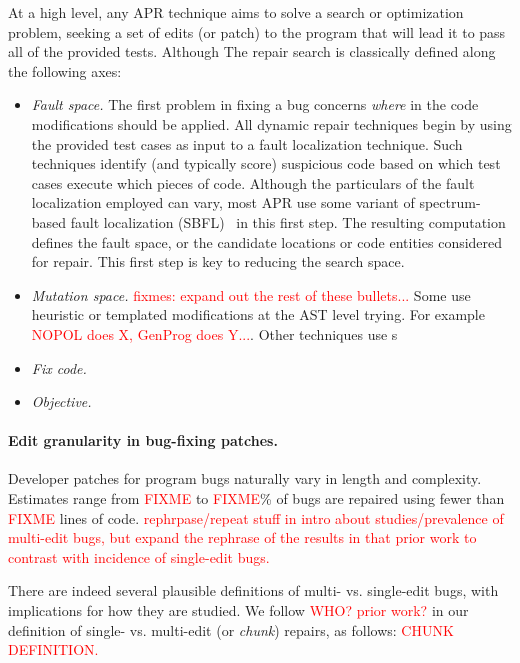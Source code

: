 \documentclass[sigconf, timestamp-false, anonymous=true]{acmart}
\newcommand\todo[1]{\textcolor{red}{#1}}
\begin{document}
At a high level, any APR technique aims to solve a search or optimization
problem, seeking a set of edits (or patch) to the program that will lead it to
pass all of the provided tests.  Although The repair search is classically defined along
the following axes:
\begin{itemize}
\item \emph{Fault space.} The first problem in fixing a bug concerns
  \emph{where} in the code modifications should be applied. All dynamic repair
  techniques begin by using the provided test cases as input to a fault
  localization technique. Such techniques identify (and typically score)
  suspicious code based on which test cases execute which pieces of code.
  Although the particulars of the fault localization employed can vary, most APR
  use some variant of spectrum-based fault localization (SBFL)~\cite{refs} in
  this first step. The resulting computation defines the fault space, or the
  candidate locations or code entities considered for repair. This first step is
  key to reducing the search space.
\item \emph{Mutation space.} \todo{fixmes: expand out the rest of these bullets...}
Some use heuristic or templated modifications at the AST level trying. For
example \todo{NOPOL does X, GenProg does Y...}. Other techniques use s

\item \emph{Fix code.}

\item \emph{Objective.} 

\end{itemize}



\paragraph{Edit granularity in bug-fixing patches.}  Developer patches for
program bugs naturally vary in length and complexity.  Estimates range from
\todo{FIXME} to \todo{FIXME}\% of bugs are repaired using fewer than
\todo{FIXME} lines of code.  \todo{rephrpase/repeat stuff in intro about
  studies/prevalence of multi-edit bugs, but expand the rephrase of the results
  in that prior work to contrast with incidence of single-edit bugs.}  

There are indeed several plausible definitions of multi- vs. single-edit bugs,
with implications for how they are studied.  We follow \todo{WHO? prior work?}
in our definition of single- vs. multi-edit (or \emph{chunk}) repairs, as
follows: 
\todo{CHUNK DEFINITION.}
\end{document}
